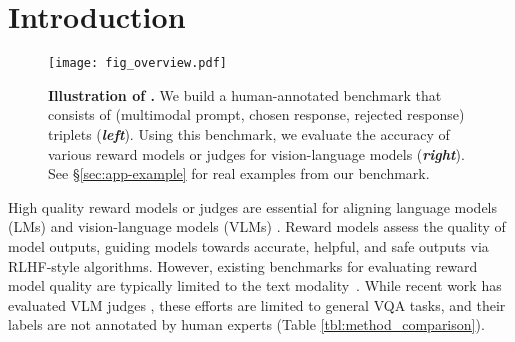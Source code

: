 \section{Introduction}

\begin{figure}[h]
    \centering
    \texttt{[image: fig\_overview.pdf]}
    \caption{\textbf{Illustration of \methodname.} We build a human-annotated benchmark that consists of (multimodal prompt, chosen response, rejected response) triplets (\textbf{\textit{left}}). Using this benchmark, we evaluate the accuracy of various reward models or judges for vision-language models (\textbf{\textit{right}}).
    See \S \ref{sec:app-example} for real examples from our benchmark.
    }
    \label{fig:overview}
\end{figure}





High quality reward models or judges are essential for aligning language models (LMs) and vision-language models (VLMs) \citep{instructgpt, bai2022constitutional, llama3}. 
Reward models assess the quality of model outputs, guiding models towards accurate, helpful, and safe outputs via RLHF-style algorithms. %
However, existing benchmarks for evaluating reward model quality are typically limited to the text modality~\citep{bai2022training,bai2022training,stiennon2020learning,tan2024judgebench}.
While recent work has evaluated VLM judges \citep{lee2024prometheusvision, xiong2024llava, chen2024mllm, li2024vlrewardbench}, these efforts are limited to general VQA tasks, and their labels are not annotated by human experts (Table \ref{tbl:method_comparison}). 

